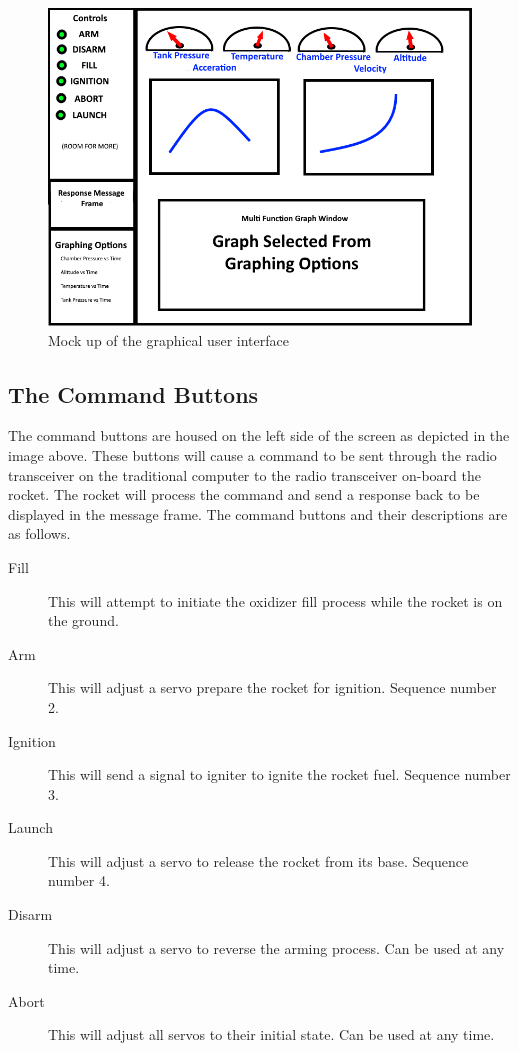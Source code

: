 \documentclass[10pt,draftclsnofoot,onecolumn,compsoc]{IEEEtran}
\begin{document}
\begin{figure}[!ht]
  \caption{Mock up of the graphical user interface}
  \centering
	\includegraphics[scale=.85]{HyRoUIMockup}
\end{figure}

\subsection{The Command Buttons}
The command buttons are housed on the left side of the screen as depicted in the image above. These buttons will cause a command to be sent through the radio transceiver on the traditional computer to the radio transceiver on-board the rocket. The rocket will process the command and send a response back to be displayed in the message frame. The command buttons and their descriptions are as follows.\par

\begin{description}
\item[Fill] This will attempt to initiate the oxidizer fill process while the rocket is on the ground.
\item[Arm] This will adjust a servo prepare the rocket for ignition. Sequence number 2.
\item[Ignition] This will send a signal to igniter to ignite the rocket fuel. Sequence number 3.
\item[Launch] This will adjust a servo to release the rocket from its base. Sequence number 4.
\item[Disarm] This will adjust a servo to reverse the arming process. Can be used at any time.
\item[Abort] This will adjust all servos to their initial state. Can be used at any time.
\end{description}
\end{document}
